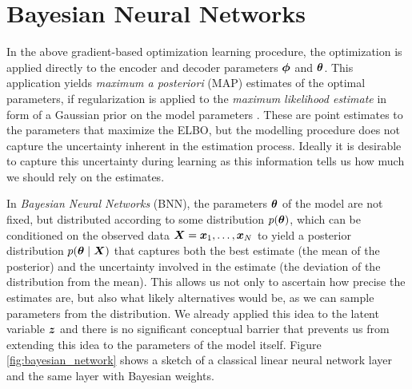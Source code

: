 \section{Bayesian Neural Networks}
\label{sec:bayesian_neural_networks}
In the above gradient-based optimization learning procedure, the optimization is applied directly to the encoder and decoder parameters $\bm{ \phi }$ and $\bm{ \theta }$. This application yields \textit{maximum a posteriori} (MAP) estimates of the optimal parameters, if regularization is applied to the \textit{maximum likelihood estimate} in form of a Gaussian prior on the model parameters \cite{blundell2015weight}. These are point estimates to the parameters that maximize the ELBO, but the modelling procedure does not capture the uncertainty inherent in the estimation process. Ideally it is desirable to capture this uncertainty during learning as this information tells us how much we should rely on the estimates.

In \textit{Bayesian Neural Networks} (BNN), the parameters $\bm{ \theta }$ of the model are not fixed, but distributed according to some distribution $p(\bm{ \theta })$, which can be conditioned on the observed data $\bm{ X } = \bm{ x }_1, \ldots, \bm{ x }_N$ to yield a posterior distribution $p(\bm{ \theta } \mid \bm{ X })$ that captures both the best estimate (the mean of the posterior) and the uncertainty involved in the estimate (the deviation of the distribution from the mean). This allows us not only to ascertain how precise the estimates are, but also what likely alternatives would be, as we can sample parameters from the distribution. We already applied this idea to the latent variable $\bm{ z }$ and there is no significant conceptual barrier that prevents us from extending this idea to the parameters of the model itself. Figure \ref{fig:bayesian_network} shows a sketch of a classical linear neural network layer and the same layer with Bayesian weights.

